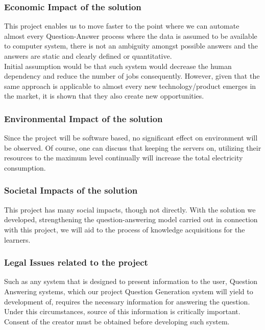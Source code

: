\documentclass{mefsdp}
\begin{document}
	\subsubsection{Economic Impact of the solution}
	This project enables us to move faster to the point where we can automate almost every Question-Answer process where the data is assumed to be available to computer system, there is not an ambiguity amongst possible answers and the answers are static and clearly defined or quantitative.\\
	
	Initial assumption would be that such system would decrease the human dependency and reduce the number of jobs consequently. However, given that the same approach is applicable to almost every new technology/product emerges in the market, it is shown that they also create new opportunities. 
	
	
	\subsubsection{Environmental Impact of the solution}
	Since the project will be software based, no significant effect on environment will be observed. Of course, one can discuss that keeping the servers on, utilizing their resources to the maximum level continually will increase the total electricity consumption. 
	
	\subsubsection{Societal Impacts of the solution}
	This project has many social impacts, though not directly. With the solution we developed, strengthening the question-answering model carried out in connection with this project, we will aid to the process of knowledge acquisitions for the learners.
	
	
	\subsubsection{Legal Issues related to the project}
	Such as any system that is designed to present information to the user, Question Answering systems, which our project Question Generation system will yield to development of, requires the necessary information for answering the question. Under this circumstances, source of this information is critically important. Consent of the creator must be obtained before developing such system. \\
	
\end{document}
